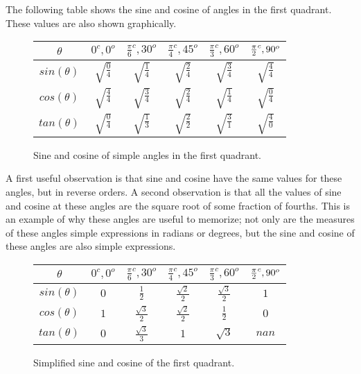 The following table shows the sine and cosine of angles in the first quadrant.  These values are also shown graphically.\\

\begin{figure}[htb]
\caption{Sine and cosine of simple angles in the first quadrant.}
\label{fig:simple_angles_first_quadrant}
\begin{center}
\begin{tabular}{ | c | c | c | c | c | c | }
\hline 
$\theta$ & $0^c , 0^o$ & $\frac{\pi}{6}^c , 30^o$ & $\frac{\pi}{4}^c , 45^o$ & $\frac{\pi}{3}^c , 60^o$ & $\frac{\pi}{2}^c , 90^o$\\
\hline 
$sin(\theta)$ & $\sqrt{\frac{0}{4}}$ & $\sqrt{\frac{1}{4}}$ & $\sqrt{\frac{2}{4}}$ & $\sqrt{\frac{3}{4}}$ & $\sqrt{\frac{4}{4}}$\\
\hline 
$cos(\theta)$ & $\sqrt{\frac{4}{4}}$ & $\sqrt{\frac{3}{4}}$ & $\sqrt{\frac{2}{4}}$ & $\sqrt{\frac{1}{4}}$ & $\sqrt{\frac{0}{4}}$\\
\hline 
$tan(\theta)$ & $\sqrt{\frac{0}{4}}$ & $\sqrt{\frac{1}{3}}$ & $\sqrt{\frac{2}{2}}$ & $\sqrt{\frac{3}{1}}$ & $\sqrt{\frac{4}{0}}$\\
\hline
\end{tabular}
\end{center}
\end{figure}

\newpage

A first useful observation is that sine and cosine have the same values for these angles, but in reverse orders.  A second observation is that all the values of sine and cosine at these angles are the square root of some fraction of fourths.  This is an example of why these angles are useful to memorize; not only are the measures of these angles simple expressions in radians or degrees, but the sine and cosine of these angles are also simple expressions.

\begin{figure}[htb]
\caption{Simplified sine and cosine of the first quadrant.}
\label{fig:simplified_first_quadrant}
\begin{center}
\begin{tabular}{ | c | c | c | c | c | c | }
\hline 
$\theta$ & $0^c , 0^o$ & $\frac{\pi}{6}^c , 30^o$ & $\frac{\pi}{4}^c , 45^o$ & $\frac{\pi}{3}^c , 60^o$ & $\frac{\pi}{2}^c , 90^o$\\
\hline 
$sin(\theta)$ & $0$ & $\frac{1}{2}$ & $\frac{\sqrt{2}}{2}$ & $\frac{\sqrt{3}}{2}$ & $1$\\
\hline 
$cos(\theta)$ & $1$ & $\frac{\sqrt{3}}{2}$ & $\frac{\sqrt{2}}{2}$ & $\frac{1}{2}$ & $0$\\
\hline 
$tan(\theta)$ & $0$ & $\frac{\sqrt{3}}{3}$ & $1$ & $\sqrt{3}$ & $nan$\\
\hline
\end{tabular}
\end{center}
\end{figure}

